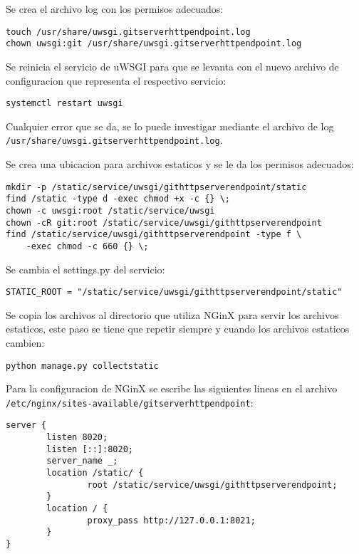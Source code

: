 Se crea el archivo log con los permisos adecuados:
\begin{lstlisting}
touch /usr/share/uwsgi.gitserverhttpendpoint.log
chown uwsgi:git /usr/share/uwsgi.gitserverhttpendpoint.log
\end{lstlisting}

Se reinicia el servicio de uWSGI para que se levanta con el nuevo archivo de configuracion que representa el respectivo servicio:
\begin{lstlisting}
systemctl restart uwsgi
\end{lstlisting}
Cualquier error que se da, se lo puede investigar mediante el archivo de log \\ \texttt{/usr/share/uwsgi.gitserverhttpendpoint.log}.

Se crea una ubicacion para archivos estaticos y se le da los permisos adecuados:
\begin{lstlisting}
mkdir -p /static/service/uwsgi/githttpserverendpoint/static
find /static -type d -exec chmod +x -c {} \;
chown -c uwsgi:root /static/service/uwsgi
chown -cR git:root /static/service/uwsgi/githttpserverendpoint
find /static/service/uwsgi/githttpserverendpoint -type f \
    -exec chmod -c 660 {} \;
\end{lstlisting}

Se cambia el settings.py del servicio:
\lstset{language=Python}
\begin{lstlisting}
STATIC_ROOT = "/static/service/uwsgi/githttpserverendpoint/static"
\end{lstlisting}
\lstset{language=Bash}

Se copia los archivos al directorio que utiliza NGinX para servir los archivos estaticos, este paso se tiene que repetir siempre y cuando los archivos estaticos cambien:
\begin{lstlisting}
python manage.py collectstatic
\end{lstlisting}

Para la configuracion de NGinX se escribe las siguientes lineas en el archivo \\
\texttt{/etc/nginx/sites-available/gitserverhttpendpoint}:
\begin{lstlisting}
server {
        listen 8020;
        listen [::]:8020;
        server_name _;
        location /static/ {
                root /static/service/uwsgi/githttpserverendpoint;
        }
        location / {
                proxy_pass http://127.0.0.1:8021;
        }
}
\end{lstlisting}


